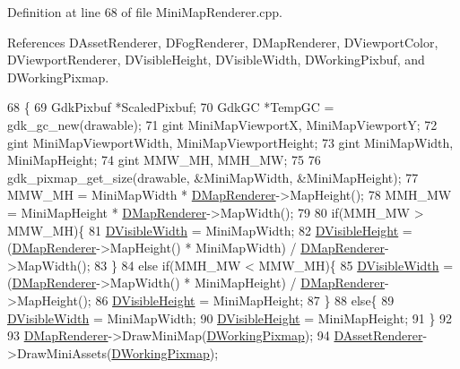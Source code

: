Definition at line 68 of file Mini\+Map\+Renderer.\+cpp.



References D\+Asset\+Renderer, D\+Fog\+Renderer, D\+Map\+Renderer, D\+Viewport\+Color, D\+Viewport\+Renderer, D\+Visible\+Height, D\+Visible\+Width, D\+Working\+Pixbuf, and D\+Working\+Pixmap.


\begin{DoxyCode}
68                                                        \{
69     GdkPixbuf *ScaledPixbuf;
70     GdkGC *TempGC = gdk\_gc\_new(drawable);
71     gint MiniMapViewportX, MiniMapViewportY;
72     gint MiniMapViewportWidth, MiniMapViewportHeight;
73     gint MiniMapWidth, MiniMapHeight;
74     gint MMW\_MH, MMH\_MW;
75     
76     gdk\_pixmap\_get\_size(drawable, &MiniMapWidth, &MiniMapHeight); 
77     MMW\_MH = MiniMapWidth * \hyperlink{classCMiniMapRenderer_a6656b208c6b29641a151ea4cbcfda31b}{DMapRenderer}->MapHeight();
78     MMH\_MW = MiniMapHeight * \hyperlink{classCMiniMapRenderer_a6656b208c6b29641a151ea4cbcfda31b}{DMapRenderer}->MapWidth();
79     
80     \textcolor{keywordflow}{if}(MMH\_MW > MMW\_MH)\{
81         \hyperlink{classCMiniMapRenderer_aedcb790a697e6f606cd7fa5089a41359}{DVisibleWidth} = MiniMapWidth;
82         \hyperlink{classCMiniMapRenderer_aad56353e51a1a3da66d3428cf0f1ccf8}{DVisibleHeight} = (\hyperlink{classCMiniMapRenderer_a6656b208c6b29641a151ea4cbcfda31b}{DMapRenderer}->MapHeight() * MiniMapWidth) / 
      \hyperlink{classCMiniMapRenderer_a6656b208c6b29641a151ea4cbcfda31b}{DMapRenderer}->MapWidth();        
83     \}
84     \textcolor{keywordflow}{else} \textcolor{keywordflow}{if}(MMH\_MW < MMW\_MH)\{
85         \hyperlink{classCMiniMapRenderer_aedcb790a697e6f606cd7fa5089a41359}{DVisibleWidth} = (\hyperlink{classCMiniMapRenderer_a6656b208c6b29641a151ea4cbcfda31b}{DMapRenderer}->MapWidth() * MiniMapHeight) / 
      \hyperlink{classCMiniMapRenderer_a6656b208c6b29641a151ea4cbcfda31b}{DMapRenderer}->MapHeight();
86         \hyperlink{classCMiniMapRenderer_aad56353e51a1a3da66d3428cf0f1ccf8}{DVisibleHeight} = MiniMapHeight;
87     \}
88     \textcolor{keywordflow}{else}\{
89         \hyperlink{classCMiniMapRenderer_aedcb790a697e6f606cd7fa5089a41359}{DVisibleWidth} = MiniMapWidth;
90         \hyperlink{classCMiniMapRenderer_aad56353e51a1a3da66d3428cf0f1ccf8}{DVisibleHeight} = MiniMapHeight;
91     \}
92     
93     \hyperlink{classCMiniMapRenderer_a6656b208c6b29641a151ea4cbcfda31b}{DMapRenderer}->DrawMiniMap(\hyperlink{classCMiniMapRenderer_a53bf622d2048ea136ae256e8d4b81fb5}{DWorkingPixmap});
94     \hyperlink{classCMiniMapRenderer_a352998f61c6777ccb3969712b8e691d9}{DAssetRenderer}->DrawMiniAssets(\hyperlink{classCMiniMapRenderer_a53bf622d2048ea136ae256e8d4b81fb5}{DWorkingPixmap});

\end{DoxyCode}
